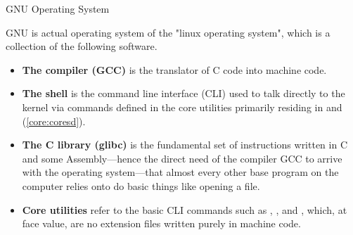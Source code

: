 \documentclass[10pt]{article}
\begin{document}
    \begin{core}{GNU Operating System}

      GNU is actual operating system of the "linux operating system", which is a collection of the following software.

      \begin{itemize}

        \item \textbf{The compiler (GCC)} is the translator of C code into machine code.

        \item \textbf{The shell} is the command line interface (CLI) used to talk directly to the kernel via commands defined in the core utilities primarily residing in  and  (\autoref{core:coresd}).

        \item \textbf{The C library (glibc)} is the fundamental set of instructions written in C and some Assembly---hence the direct need of the compiler GCC to arrive with the operating system---that almost every other base program on the computer relies onto do basic things like opening a file.

        \item \textbf{Core utilities} refer to the basic CLI commands such as , , and , which, at face value, are no extension files written purely in machine code.

      \end{itemize}

    \end{core}
\end{document}
